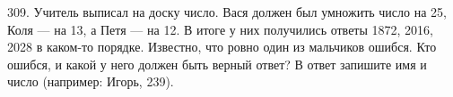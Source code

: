 309. Учитель выписал на доску число. Вася должен был умножить число на 25, Коля --- на 13, а Петя --- на 12. В итоге у них получились ответы 1872, 2016, 2028 в каком-то порядке. Известно, что ровно один из мальчиков ошибся. Кто ошибся, и какой у него должен быть верный ответ? В ответ запишите имя и число (например: Игорь, 239).\\
